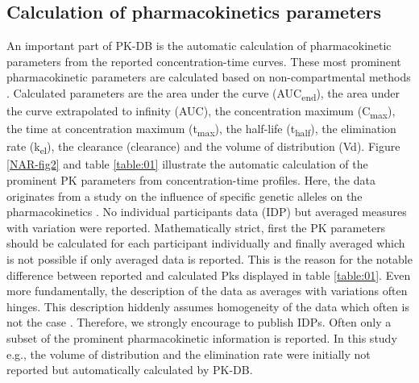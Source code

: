 \documentclass[a4,center,fleqn]{NAR}
\begin{document}
\subsection{Calculation of pharmacokinetics parameters}
An important part of PK-DB is the automatic calculation of pharmacokinetic parameters from the reported concentration-time curves. These most prominent pharmacokinetic parameters are calculated based on non-compartmental methods \cite{Gabrielsson2012}. Calculated parameters are the area under the curve (\si{AUC_{end}}), the area under the curve extrapolated to infinity (\si{AUC_{\infty}}), the concentration maximum (\si{C_{max}}), the time at concentration maximum (\si{t_{max}}), the half-life (\si{t_{half}}), the elimination rate (\si{k_{el}}), the clearance (\si{clearance}) and the volume of distribution (\si{Vd}). Figure \ref{NAR-fig2} and table \ref{table:01} illustrate the automatic calculation of the prominent PK parameters from concentration-time profiles. Here, the data originates from a study on the influence of specific genetic alleles on the pharmacokinetics \cite{Wu2014}. No individual participants data (IDP) but averaged measures with variation were reported. Mathematically strict, first the PK parameters should be calculated for each participant individually and finally averaged which is not possible if only averaged data is reported. This is the reason for the notable difference between reported and calculated Pks displayed in table \ref{table:01}. Even more fundamentally, the description of the data as averages with variations often hinges. This description hiddenly assumes homogeneity of the data which often is not the case \cite{Hanin2017}. Therefore, we strongly encourage to publish IDPs. Often only a subset of the prominent pharmacokinetic information is reported. In this study e.g., the volume of distribution and the elimination rate were initially not reported but automatically calculated by PK-DB.
\end{document}

